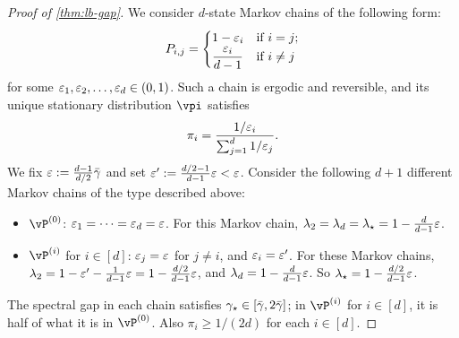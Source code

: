 \begin{proof}[Proof of \cref{thm:lb-gap}]
  We consider $d$-state Markov chains of the following form:
  \[
    P_{i,j} =
    \begin{cases}
      1-\varepsilon_i & \text{if $i = j$} ; \\
      \displaystyle\frac{\varepsilon_i}{d-1} & \text{if $i \neq j$}
    \end{cases}
  \]
  for some $\varepsilon_1, \varepsilon_2, \dotsc, \varepsilon_d \in (0,1)$.
  Such a chain is ergodic and reversible, and its unique stationary
  distribution $\vpi$ satisfies
  \[
    \pi_i = \frac{1/\varepsilon_i}{\sum_{j=1}^d 1/\varepsilon_j}
    .
  \]
  We fix $\varepsilon := \frac{d-1}{d/2}\bar\gamma$ and set $\varepsilon' :=
  \frac{d/2-1}{d-1} \varepsilon < \varepsilon$.
  Consider the following $d+1$ different Markov chains of the type
  described above:
  \begin{itemize}
    \item
      $\vP^{(0)}$: $\varepsilon_1 = \dotsb = \varepsilon_d = \varepsilon$.
      For this Markov chain, $\lambda_2 = \lambda_d = \lambda_{\star} =
      1-\frac{d}{d-1}\varepsilon$.

    \item
      $\vP^{(i)}$ for $i \in [d]$: $\varepsilon_j = \varepsilon$ for $j \neq i$,
      and $\varepsilon_i = \varepsilon'$.
      For these Markov chains, $\lambda_2 = 1 - \varepsilon' -
      \frac{1}{d-1}\varepsilon = 1 - \frac{d/2}{d-1} \varepsilon$,
      and $\lambda_d = 1 - \frac{d}{d-1} \varepsilon$.
      So $\lambda_{\star} = 1-\frac{d/2}{d-1} \varepsilon$.

  \end{itemize}
  The spectral gap in each chain satisfies $\gamma_{\star} \in
  [\bar\gamma,2\bar\gamma]$; in $\vP^{(i)}$ for $i \in [d]$, it is half
  of what it is in $\vP^{(0)}$.
  Also $\pi_i \geq 1/(2d)$ for each $i \in [d]$.


\end{proof}
